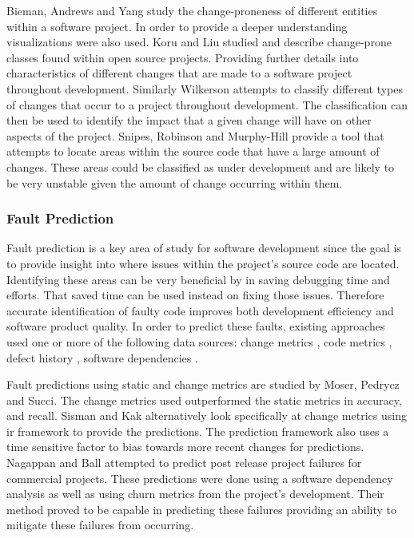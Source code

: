 Bieman, Andrews and Yang study the change-proneness of different entities within a software project\cite{Bieman2003a}. In order to provide a deeper understanding visualizations were also used. Koru and Liu studied and describe change-prone classes found within open source projects. Providing further details into characteristics of different changes that are made to a software project throughout development. Similarly Wilkerson attempts to classify different types of changes that occur to a project throughout development. The classification can then be used to identify the impact that a given change will have on other aspects of the project. Snipes, Robinson and Murphy-Hill provide a tool that attempts to locate areas within the source code that have a large amount of changes\cite{Snipes2011}. These areas could be classified as under development and are likely to be very unstable given the amount of change occurring within them.



\subsubsection{Fault Prediction}

Fault prediction is a key area of study for software development since the goal is to provide insight into where issues within the project's source code are located. Identifying these areas can be very beneficial by in saving debugging time and efforts. That saved time can be used instead on fixing those issues. Therefore accurate identification of faulty code improves both development efficiency and software product quality. In order to predict these faults, existing approaches used one or more of the following data sources: change metrics \cite{Moser2008, Sisman2012, Nagappan2007}, code metrics \cite{Moser2008, Thwin2005}, defect history \cite{Sisman2012}, software dependencies \cite{Nagappan2007}.

Fault predictions using static and change metrics are studied by Moser, Pedrycz and Succi\cite{Moser2008}. The change metrics used outperformed the static metrics in accuracy, and recall. Sisman and Kak alternatively look specifically at change metrics using \gls{ir} framework to provide the predictions. The prediction framework also uses a time sensitive factor to bias towards more recent changes for predictions. Nagappan and Ball attempted to predict post release project failures for commercial projects. These predictions were done using a software dependency analysis as well as using churn metrics from the project's development. Their method proved to be capable in predicting these failures providing an ability to mitigate these failures from occurring.

